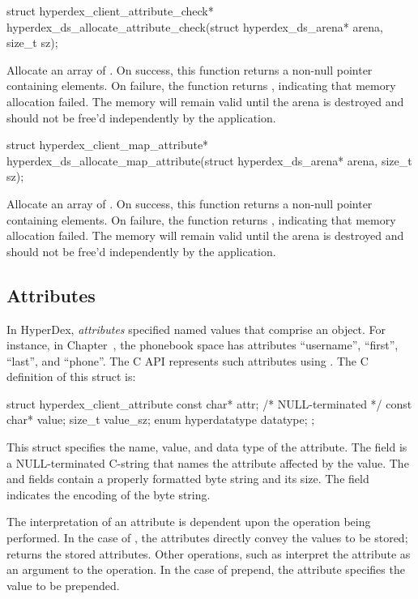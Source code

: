 \funcsep
\begin{ccode}
struct hyperdex_client_attribute_check*
hyperdex_ds_allocate_attribute_check(struct hyperdex_ds_arena* arena, size_t sz);
\end{ccode}
\funcdesc Allocate an array of .
On success, this function returns a non-null pointer containing 
elements.  On failure, the function returns , indicating that memory
allocation failed.  The memory will remain valid until the arena is destroyed
and should not be free'd independently by the application.

\funcsep
\begin{ccode}
struct hyperdex_client_map_attribute*
hyperdex_ds_allocate_map_attribute(struct hyperdex_ds_arena* arena, size_t sz);
\end{ccode}
\funcdesc Allocate an array of .
On success, this function returns a non-null pointer containing 
elements.  On failure, the function returns , indicating that memory
allocation failed.  The memory will remain valid until the arena is destroyed
and should not be free'd independently by the application.

\subsection{Attributes}

In HyperDex, {\em attributes} specified named values that comprise an object.
For instance, in Chapter~, the phonebook space has
attributes ``username'', ``first'', ``last'', and ``phone''.  The C API
represents such attributes using .  The
C definition of this struct is:

\begin{ccode}
struct hyperdex_client_attribute
{
    const char* attr; /* NULL-terminated */
    const char* value;
    size_t value_sz;
    enum hyperdatatype datatype;
};
\end{ccode}

This struct specifies the name, value, and data type of the attribute.  The
 field is a NULL-terminated C-string that names the attribute
affected by the value.  The  and  fields contain a
properly formatted byte string and its size.  The  field
indicates the encoding of the byte string.

The interpretation of an attribute is dependent upon the operation being
performed.  In the case of , the attributes directly
convey the values to be stored;  returns the
stored attributes.  Other operations, such as
 interpret the attribute as an argument
to the operation.  In the case of prepend, the attribute specifies the value to
be prepended.

